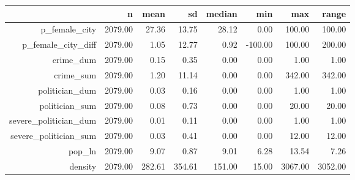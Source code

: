 \begin{table}[ht]
\centering
\begin{tabular}{rrrrrrrr}
  \hline
 & n & mean & sd & median & min & max & range \\ 
  \hline
p\_female\_city & 2079.00 & 27.36 & 13.75 & 28.12 & 0.00 & 100.00 & 100.00 \\ 
  p\_female\_city\_diff & 2079.00 & 1.05 & 12.77 & 0.92 & -100.00 & 100.00 & 200.00 \\ 
  crime\_dum & 2079.00 & 0.15 & 0.35 & 0.00 & 0.00 & 1.00 & 1.00 \\ 
  crime\_sum & 2079.00 & 1.20 & 11.14 & 0.00 & 0.00 & 342.00 & 342.00 \\ 
  politician\_dum & 2079.00 & 0.03 & 0.16 & 0.00 & 0.00 & 1.00 & 1.00 \\ 
  politician\_sum & 2079.00 & 0.08 & 0.73 & 0.00 & 0.00 & 20.00 & 20.00 \\ 
  severe\_politician\_dum & 2079.00 & 0.01 & 0.11 & 0.00 & 0.00 & 1.00 & 1.00 \\ 
  severe\_politician\_sum & 2079.00 & 0.03 & 0.41 & 0.00 & 0.00 & 12.00 & 12.00 \\ 
  pop\_ln & 2079.00 & 9.07 & 0.87 & 9.01 & 6.28 & 13.54 & 7.26 \\ 
  density & 2079.00 & 282.61 & 354.61 & 151.00 & 15.00 & 3067.00 & 3052.00 \\ 
   \hline
\end{tabular}
\end{table}
